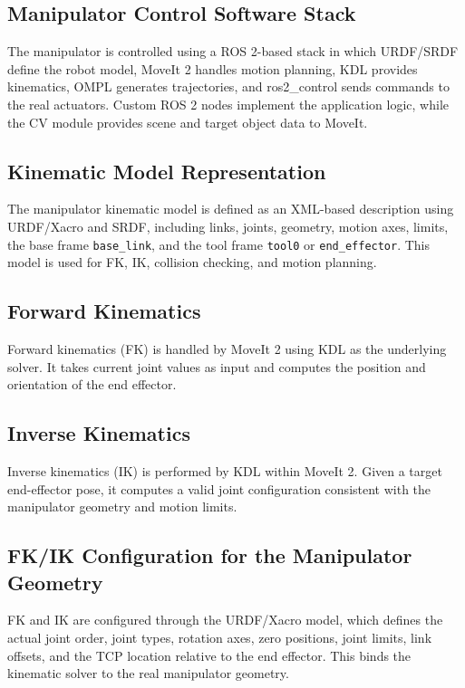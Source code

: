 

\subsection*{Manipulator Control Software Stack}
The manipulator is controlled using a ROS 2-based stack in which URDF/SRDF define the robot model, MoveIt 2 handles motion planning, KDL provides kinematics, OMPL generates trajectories, and ros2\_control sends commands to the real actuators. Custom ROS 2 nodes implement the application logic, while the CV module provides scene and target object data to MoveIt.

\subsection*{Kinematic Model Representation}
The manipulator kinematic model is defined as an XML-based description using URDF/Xacro and SRDF, including links, joints, geometry, motion axes, limits, the base frame \texttt{base\_link}, and the tool frame \texttt{tool0} or \texttt{end\_effector}. This model is used for FK, IK, collision checking, and motion planning.

\subsection*{Forward Kinematics}
Forward kinematics (FK) is handled by MoveIt 2 using KDL as the underlying solver. It takes current joint values as input and computes the position and orientation of the end effector.

\subsection*{Inverse Kinematics}
Inverse kinematics (IK) is performed by KDL within MoveIt 2. Given a target end-effector pose, it computes a valid joint configuration consistent with the manipulator geometry and motion limits.

\subsection*{FK/IK Configuration for the Manipulator Geometry}
FK and IK are configured through the URDF/Xacro model, which defines the actual joint order, joint types, rotation axes, zero positions, joint limits, link offsets, and the TCP location relative to the end effector. This binds the kinematic solver to the real manipulator geometry.

